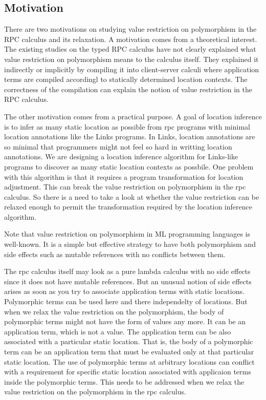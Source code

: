 \documentclass[a4paper]{article}
\theoremstyle{plain}
\theoremstyle{definition}
\begin{document}
\subsection{Motivation}

%
There are two motivations on studying value restriction on
polymorphism in the RPC calculus and its relaxation.
%
A motivation comes from a theoretical interest.
%
The existing studies on the typed RPC calculus have not clearly
explained what value restriction on polymorphism means to the calculus
itself.
%
They explained it indirectly or implicitly by compiling it into
client-server calculi where application terms are compiled accordingl
to statically determined location contexts.
%
The correctness of the
compilation can explain the notion of value restriction in the RPC
calculus.

%
The other motivation comes from a practical purpose.
%
A goal of location inference is to infer as many static location as
possible from rpc programs with minimal location annotations like the
Links programs.
%
In Links, location annotations are so minimal that programmers might
not feel so hard in writting location annotations.
%
We are designing a location inference algorithm for Links-like
programs to discover as many static location contexts as possbile.
%
One problem with this algorithm is that it requires a program
transformation for location adjustment.
%
This can break the value restriction on polymorphism in the rpc
calculus.
%
So there is a need to take a look at whether the value restriction can
be relaxed enough to permit the transformation required by the
location inference algorithm.

%
Note that value restriction on polymorphism in ML programming
languages is well-known.
%
It is a simple but effective strategy to have both polymorphism and
side effects such as mutable references with no conflicts between
them.

%
The rpc calculus itself may look as a pure lambda calculus with no
side effects since it does not have mutable references.
%
But an unusual notion of side effects arises as soon as you try to
associate application terms with static locations.
%
Polymorphic terms can be used here and there independelty of
locations.
%
But when we relax the value restriction on the polymorphism, the body
of polymorphic terms might not have the form of values any more.
%
It can be an application term, which is not a value.
%
The application term can be also associated with a particular static
location.
%
That is, the body of a polymorphic term can be an application term
that must be evaluated only at that particular static location.
%
The use of polymorphic terms at arbitrary locations can conflict with
a requirement for specific static location associated with applicaion
terms inside the polymorphic terms.
%
This needs to be addressed when we relax the value restriction on the
polymorphism in the rpc calculus.
\end{document}
